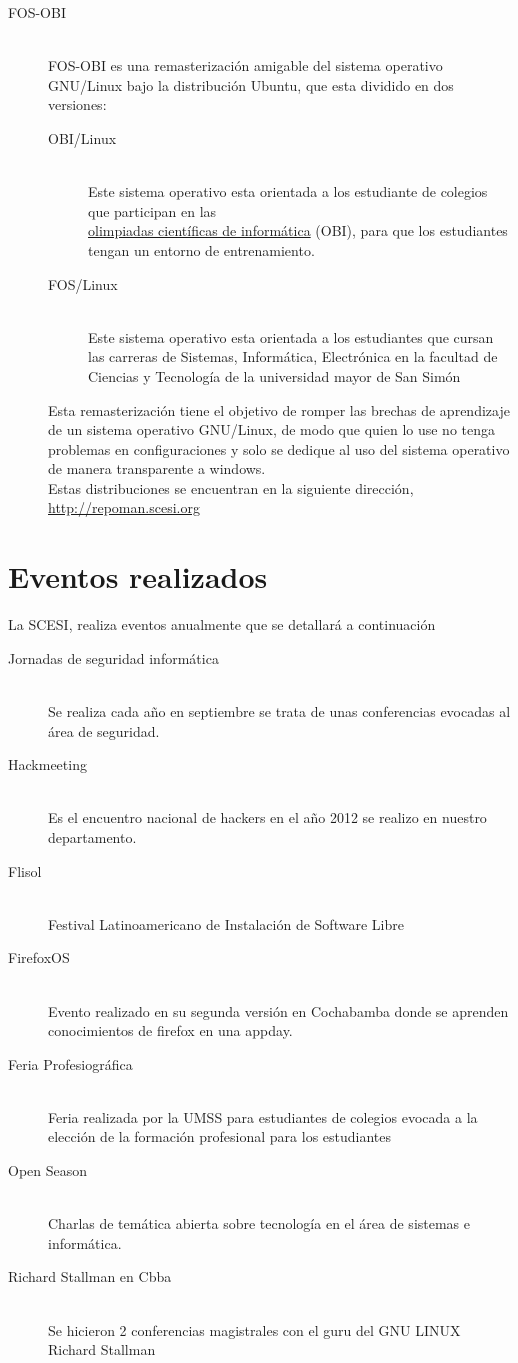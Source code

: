 \documentclass[11pt,letterpaper]{article}
\begin{document}
\begin{description}
	\item[FOS-OBI]~\\
		FOS-OBI es una remasterización amigable del sistema operativo GNU/Linux bajo la distribución Ubuntu, que esta dividido en dos versiones:
		\begin{description}
			\item[OBI/Linux]~\\
				Este sistema operativo esta orientada a los estudiante de colegios que participan en las \\\underline{olimpiadas científicas de informática} (OBI), para que los estudiantes tengan un entorno de entrenamiento.
			\item[FOS/Linux]~\\
				Este sistema operativo esta orientada a los estudiantes que cursan las carreras de Sistemas, Informática, Electrónica en la facultad de Ciencias y Tecnología de la universidad mayor de San Simón 
		\end{description}
		Esta remasterización tiene el objetivo de romper las brechas de aprendizaje de un sistema operativo GNU/Linux, de modo  que quien lo use no tenga problemas en configuraciones y solo se dedique al uso del sistema operativo de manera transparente a windows.\\
		Estas distribuciones se encuentran en la siguiente dirección, \url{http://repoman.scesi.org}
	\end{description} 
\section{Eventos realizados}
La SCESI, realiza eventos anualmente que se detallará a continuación
\begin{description}
	\item[Jornadas de seguridad informática]~\\
		Se realiza cada año en septiembre se trata de unas conferencias evocadas al área de seguridad.
	\item[Hackmeeting]~\\
		Es el encuentro nacional de hackers en el año 2012 se realizo en nuestro departamento.
	\item[Flisol]~\\
		Festival Latinoamericano de Instalación de Software Libre
	\item[FirefoxOS]~\\
		Evento realizado en su segunda versión en Cochabamba donde se aprenden conocimientos de firefox en una appday.
	\item[Feria Profesiográfica]~\\
		Feria realizada por la UMSS para estudiantes de colegios evocada a la elección de la formación profesional para los estudiantes
	\item[Open Season]~\\
		Charlas de temática abierta sobre tecnología en el área de sistemas e informática.
	\item[Richard Stallman en Cbba]~\\
		Se hicieron 2 conferencias magistrales con el guru del GNU LINUX Richard Stallman

\end{description}
\end{document}
